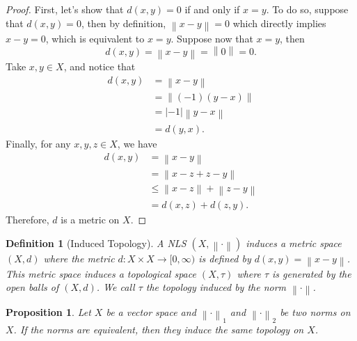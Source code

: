 \documentclass{article}
\newtheorem*{proposition}{Proposition}
\newtheorem*{definition}{Definition}
\newcommand{\lnorm}[2]{\left\lVert#2 \right\rVert_{#1}}
\newcommand{\norm}[1]{\left\lVert#1 \right\rVert}
\begin{document}
\begin{proof}
    First, let's show that $d(x,y) = 0$ if and only if $x = y$. To do so, suppose that $d(x,y) = 0$, then by definition, $\norm{x - y} = 0$ which directly implies $x - y = 0$, which is equivalent to $x = y$. Suppose now that $x = y$, then 
    $$d(x,y) = \norm{x - y} = \norm{0} = 0.$$
    Take $x,y \in X$, and notice that
    \begin{align*}
        d(x,y) &= \norm{ x- y}\\
        &= \norm{(-1)(y - x)} \\
        & = |-1|\norm{y - x} \\
        &= d(y,x).
    \end{align*}
    Finally, for any $x,y,z \in X$, we have
    \begin{align*}
        d(x,y) &= \norm{x - y} \\
        &= \norm{x - z + z - y} \\
        &\leq \norm{x - z} + \norm{z - y} \\
        &= d(x,z) + d(z,y).
    \end{align*}
    Therefore, $d$ is a metric on $X$.
\end{proof}

\begin{definition}[Induced Topology]
    A NLS $(X, \norm{\cdot})$ induces a metric space $(X, d)$ where the metric $d : X \times X \to [0, \infty)$ is defined by $d(x,y) = \norm{x - y}$. This metric space induces a topological space $(X, \tau)$ where $\tau$ is generated by the open balls of $(X, d)$. We call $\tau$ the topology induced by the norm $\norm{\cdot}$.
\end{definition}

\begin{proposition}
    Let $X$ be a vector space and $\lnorm{1}{\cdot}$ and $\lnorm{2}{\cdot}$ be two norms on $X$. If the norms are equivalent, then they induce the same topology on $X$.
\end{proposition}
\end{document}
